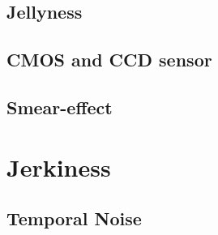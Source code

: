 \subsection{Jellyness}
\subsection{CMOS and CCD sensor}
\subsection{Smear-effect}

\section{Jerkiness}



\subsection{Temporal Noise}




